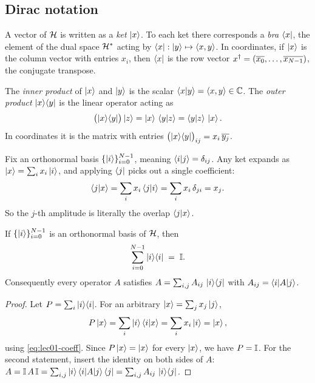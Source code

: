 \subsection{Dirac notation}

\begin{definition}\label{def:lec01-braket}
A vector of $\mathcal{H}$ is written as a \emph{ket} $\ket{x}$. To each ket there
corresponds a \emph{bra} $\bra{x}$, the element of the dual space $\mathcal{H}^{*}$
acting by $\bra{x}:\ket{y}\mapsto\langle x,y\rangle$. In coordinates, if $\ket{x}$
is the column vector with entries $x_i$, then $\bra{x}$ is the row vector
$x^{\dagger}=(\overline{x_0},\dots,\overline{x_{N-1}})$, the conjugate transpose.
\end{definition}

\begin{definition}\label{def:lec01-inout}
The \emph{inner product} of $\ket{x}$ and $\ket{y}$ is the scalar
$\braket{x|y}=\langle x,y\rangle\in\mathbb{C}$. The \emph{outer product} $\ket{x}\!\bra{y}$
is the linear operator acting as
\[
  \bigl(\ket{x}\!\bra{y}\bigr)\ket{z}=\ket{x}\,\braket{y|z}=\braket{y|z}\,\ket{x}.
\]
In coordinates it is the matrix with entries $\bigl(\ket{x}\!\bra{y}\bigr)_{ij}=x_i\,\overline{y_j}$.
\end{definition}

Fix an orthonormal basis $\{\ket{i}\}_{i=0}^{N-1}$, meaning $\braket{i|j}=\delta_{ij}$.
Any ket expands as $\ket{x}=\sum_i x_i\ket{i}$, and applying $\bra{j}$ picks out a
single coefficient:
\begin{equation}\label{eq:lec01-coeff}
  \braket{j|x}=\sum_i x_i\braket{j|i}=\sum_i x_i\,\delta_{ji}=x_j .
\end{equation}
So the $j$-th amplitude is literally the overlap $\braket{j|x}$.

\begin{theorem}\label{thm:lec01-completeness}
If $\{\ket{i}\}_{i=0}^{N-1}$ is an orthonormal basis of $\mathcal{H}$, then
\begin{equation}
  \sum_{i=0}^{N-1}\ket{i}\!\bra{i}\;=\;\mathbb{I} .
\end{equation}
Consequently every operator $A$ satisfies $A=\sum_{i,j}A_{ij}\,\ket{i}\!\bra{j}$ with
$A_{ij}=\braket{i|A|j}$.
\end{theorem}

\begin{proof}
Let $P=\sum_i\ket{i}\!\bra{i}$. For an arbitrary $\ket{x}=\sum_j x_j\ket{j}$,
\[
  P\ket{x}=\sum_i\ket{i}\braket{i|x}=\sum_i x_i\ket{i}=\ket{x},
\]
using \eqref{eq:lec01-coeff}. Since $P\ket{x}=\ket{x}$ for every $\ket{x}$, we have
$P=\mathbb{I}$. For the second statement, insert the identity on both sides of $A$:
$A=\mathbb{I}\,A\,\mathbb{I}=\sum_{i,j}\ket{i}\braket{i|A|j}\bra{j}=\sum_{i,j}A_{ij}\,\ket{i}\!\bra{j}$.
\end{proof}

